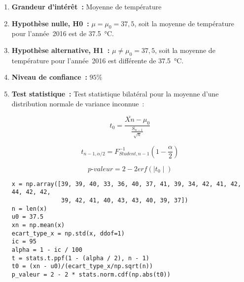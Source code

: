 \begin{enumerate}
    \item \textbf{Grandeur d'intérêt~:} Moyenne de température
    \vspace{.1cm}
  \item \textbf{Hypothèse nulle, H0~:} $\mu = \mu_{0} = 37,5$, soit la moyenne de température pour l'année~2016 est de \SI{37,5}{\celsius}.
    \vspace{.1cm}
    \item \textbf{Hypothèse alternative, H1~:} $\mu \neq \mu_{0} = 37,5$, soit la moyenne de température pour l'année~2016 est différente de \SI{37,5}{\celsius}.
    \vspace{.1cm}
    \item \textbf{Niveau de confiance~:} $95\%$
    \vspace{.1cm}
   \item \textbf{Test statistique~:}
        Test statistique bilatéral pour la moyenne d'une distribution normale de variance inconnue~:

        \begin{figure}[!h]
            \centering
            \begin{minipage}{.48\linewidth}
                \begin{equation}
                    t_{0} = \frac{\overline{Xn} - \mu_{0}}{\frac{S_{n-1}}{\sqrt{n}}}
                    \label{eq:test_norm_var_inconnue}
                \end{equation}
            \end{minipage}\hfill\vline
            \begin{minipage}{.48\linewidth}
                \begin{equation}
                    t_{n-1, \alpha/2} = F_{Student, n-1}^{-1}(1 - \frac{\alpha}{2})
                    \label{eq:p-valeur_test_norm_var_inconnue}
                \end{equation}
            \end{minipage}
        \end{figure}

        \begin{equation}
            \textit{p-valeur} = 2 - 2 erf(\mid t_{0} \mid) 
            \label{eq:p-valeur_test_norm_var_inconnue}
        \end{equation}

        \vspace{.2cm}

\begin{lstlisting}[style=myPython, caption=Code Python question 2, frame=lines]
x = np.array([39, 39, 40, 33, 36, 40, 37, 41, 39, 34, 42, 41, 42, 44, 42, 42, 
              39, 42, 41, 40, 43, 43, 40, 39, 37])
n = len(x)
u0 = 37.5
xn = np.mean(x)
ecart_type_x = np.std(x, ddof=1)
ic = 95
alpha = 1 - ic / 100
t = stats.t.ppf(1 - (alpha / 2), n - 1)
t0 = (xn - u0)/(ecart_type_x/np.sqrt(n))
p_valeur = 2 - 2 * stats.norm.cdf(np.abs(t0))


\end{lstlisting}
\end{enumerate}
